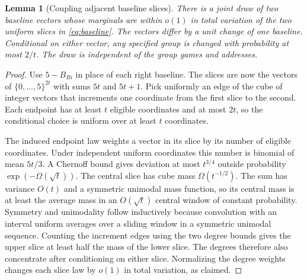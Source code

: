 \documentclass[11pt]{article}
\newtheorem{lemma}[theorem]{Lemma}
\begin{document}
\begin{lemma}[Coupling adjacent baseline slices]\label{lem:adjacent}
There is a joint draw of two baseline vectors whose marginals are
within $o(1)$ in total variation of the two uniform slices in
\eqref{eq:baseline}. The vectors differ by a unit change of one
baseline. Conditional on either vector, any specified group is
changed with probability at most $2/t$. The draw is independent
of the group games and addresses.
\end{lemma}
\begin{proof}
Use $5-B_{Ri}$ in place of each right baseline. The slices are now
the vectors of $\{0,\ldots,5\}^{2t}$ with sums $5t$ and $5t+1$.
Pick uniformly an edge of the cube of integer vectors that increments
one coordinate from the first slice to the second. Each endpoint
has at least $t$ eligible coordinates and at most $2t$, so the
conditional choice is uniform over at least $t$ coordinates.

The induced endpoint law weights a vector in its slice by its number
of eligible coordinates. Under independent uniform coordinates this
number is binomial of mean $5t/3$. A Chernoff bound gives deviation
at most $t^{3/4}$ outside probability $\exp(-\Omega(\sqrt t))$.
The central slice has cube mass $\Omega(t^{-1/2})$. The sum has
variance $O(t)$ and a symmetric unimodal mass function, so its central
mass is at least the average mass in an $O(\sqrt t)$ central window
of constant probability. Symmetry and unimodality follow inductively
because convolution with an interval uniform averages over a sliding
window in a symmetric unimodal sequence. Counting the increment edges
using the two degree bounds gives the upper slice at least half the
mass of the lower slice. The degrees therefore also concentrate after
conditioning on either slice. Normalizing the degree weights changes
each slice law by $o(1)$ in total variation, as claimed.
\end{proof}
\end{document}
